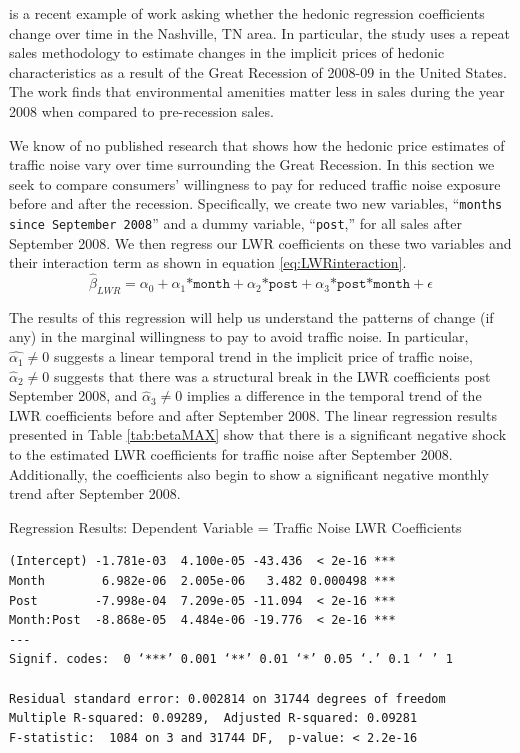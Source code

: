 \documentclass{article}\usepackage{graphicx, color}
\begin{document}
\citet{Cho2011b} is a recent example of work asking whether the hedonic regression coefficients change over time in the Nashville, TN area. In particular, the study uses a repeat sales methodology to estimate changes in the implicit prices of hedonic characteristics as a result of the Great Recession of 2008-09 in the United States. The work finds that environmental amenities matter less in sales during the year 2008 when compared to pre-recession sales.

We know of no published research that shows how the hedonic price estimates of traffic noise vary over time surrounding the Great Recession. In this section we seek to compare consumers' willingness to pay for reduced traffic noise exposure before and after the recession. Specifically, we create two new variables, ``\texttt{months since September 2008}'' and a dummy variable, ``\texttt{post},'' for all sales after September 2008. We then regress our LWR coefficients on these two variables and their interaction term as shown in equation \eqref{eq:LWRinteraction}. 
\begin{equation}\label{eq:LWRinteraction}
\hat{\beta}_{LWR} = \alpha _0 + \alpha _1 \texttt{*month} + \alpha _2  \texttt{*post} + \alpha _3 \texttt{*post*month} + \epsilon
\end{equation}

The results of this regression will help us understand the patterns of change (if any) in the marginal willingness to pay to avoid traffic noise. In particular, $\hat{\alpha _1} \neq 0$ suggests a linear temporal trend in the implicit price of traffic noise, $\hat{\alpha}_2 \neq 0$ suggests that there was a structural break in the LWR coefficients post September 2008, and $\hat{\alpha}_3 \neq 0$ implies a difference in the temporal trend of the LWR coefficients before and after September 2008. The linear regression results presented in Table \ref{tab:betaMAX} show that there is a significant negative shock to the estimated LWR coefficients for traffic noise after September 2008. Additionally, the coefficients also begin to show a significant negative monthly trend after September 2008.
\begin{table}[h]
\caption{Regression Results: Dependent Variable = Traffic Noise LWR Coefficients}\label{tab:betaMAX}
\begin{verbatim}
(Intercept) -1.781e-03  4.100e-05 -43.436  < 2e-16 ***
Month        6.982e-06  2.005e-06   3.482 0.000498 ***
Post        -7.998e-04  7.209e-05 -11.094  < 2e-16 ***
Month:Post  -8.868e-05  4.484e-06 -19.776  < 2e-16 ***
---
Signif. codes:  0 ‘***’ 0.001 ‘**’ 0.01 ‘*’ 0.05 ‘.’ 0.1 ‘ ’ 1 

Residual standard error: 0.002814 on 31744 degrees of freedom
Multiple R-squared: 0.09289,  Adjusted R-squared: 0.09281 
F-statistic:  1084 on 3 and 31744 DF,  p-value: < 2.2e-16 
\end{verbatim}
\end{table}
\end{document}
